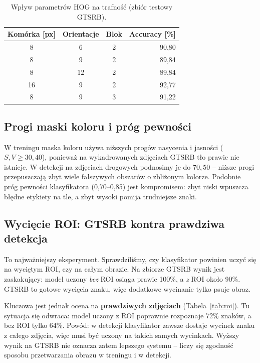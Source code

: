 \documentclass[12pt,oneside]{article}
\begin{document}
\begin{table}[H]
\centering
\begin{tabular}{cccr}
    \toprule
    Komórka [px] & Orientacje & Blok & Accuracy [\%] \\
    \midrule
    8  & 6  & 2 & 90,80 \\
    8  & 9  & 2 & 89,84 \\
    8  & 12 & 2 & 89,84 \\
    16 & 9  & 2 & 92,77 \\
    8  & 9  & 3 & 91,22 \\
    \bottomrule
\end{tabular}
\caption{Wpływ parametrów HOG na trafność (zbiór testowy GTSRB).}
\label{tab:expB}
\end{table}

\subsection{Progi maski koloru i próg pewności}
W treningu maska koloru używa niższych progów nasycenia i jasności ($S,V \ge 30,40$),
ponieważ na wykadrowanych zdjęciach GTSRB tło prawie nie istnieje. W detekcji na
zdjęciach drogowych podnosimy je do $70,50$ -- niższe progi przepuszczają zbyt
wiele fałszywych obszarów o zbliżonym kolorze. Podobnie próg pewności klasyfikatora
(0,70--0,85) jest kompromisem: zbyt niski wpuszcza błędne etykiety na tle, a zbyt
wysoki pomija trudniejsze znaki.

\subsection{Wycięcie ROI: GTSRB kontra prawdziwa detekcja}
\label{sec:roi}
To najważniejszy eksperyment. Sprawdziliśmy, czy klasyfikator powinien uczyć się
na wyciętym ROI, czy na całym obrazie. Na zbiorze GTSRB wynik jest zaskakujący:
model uczony \emph{bez} ROI osiąga prawie 100\%, a \emph{z} ROI około 90\%. GTSRB
to gotowe wycięcia znaku, więc dodatkowe wycinanie tylko psuje obraz.

Kluczowa jest jednak ocena na \textbf{prawdziwych zdjęciach} (Tabela~\ref{tab:roi}).
Tu sytuacja się odwraca: model uczony z ROI poprawnie rozpoznaje 72\% znaków, a bez
ROI tylko 64\%. Powód: w detekcji klasyfikator zawsze dostaje wycinek znaku z całego
zdjęcia, więc musi być uczony na takich samych wycinkach. Wyższy wynik na GTSRB nie
oznacza zatem lepszego systemu -- liczy się zgodność sposobu przetwarzania obrazu w
treningu i w detekcji.
\end{document}
